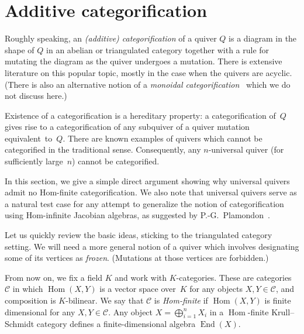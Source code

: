 \documentclass[10pt]{amsart}
\theoremstyle{definition}
\DeclareMathOperator{\Hom}{Hom}
\DeclareMathOperator{\End}{End}
\begin{document}

\section{Additive categorification}
\label{sec:categorification}

Roughly speaking, an \emph{(additive) categorification} of a quiver 
$Q$ is a diagram in the shape of $Q$ in an abelian or triangulated category together with a rule for mutating the diagram as the quiver undergoes a mutation. 
There is extensive literature on this popular topic, mostly in the case when the quivers are acyclic. 
(There is also an alternative notion of a \emph{monoidal categorification}~\cite{leclerc-hernandez}
which we do not discuss here.) 

Existence of a categorification is a hereditary property: a categorification of~$Q$ gives rise to a categorification of any subquiver of a quiver mutation equivalent~to~$Q$. 
There are known examples of quivers which cannot be categorified in the traditional sense. 
Consequently, any $n$-universal quiver (for sufficiently large~$n$) cannot be categorified. 

In this section, we give a simple direct argument showing why universal quivers admit no Hom-finite categorification. We also note that universal quivers serve as a natural test case for any attempt to generalize the notion of categorification using Hom-infinite Jacobian algebras, as suggested by P.-G.~Plamondon~\cite{plamondon}.

Let us quickly review the basic ideas, sticking to the triangulated category setting. 
We will need a more general notion of a quiver which involves designating some of its vertices as \emph{frozen}. (Mutations at those vertices are forbidden.) 

From now on, we fix a field $K$ and work with $K$-categories. These are categories $\mathcal C$ in which $\Hom(X,Y)$ is a vector space over~$K$ for any objects $X,Y\in \mathcal C$, and composition is $K$-bilinear. We say that $\mathcal C$ is \emph{Hom-finite} if $\Hom(X,Y)$ is finite dimensional for any $X,Y\in \mathcal C$.
%
Any object $X=\bigoplus_{i=1}^nX_i$ in a $\Hom $-finite Krull--Schmidt category defines a finite-dimensional algebra $\End (X)$.
\end{document}
